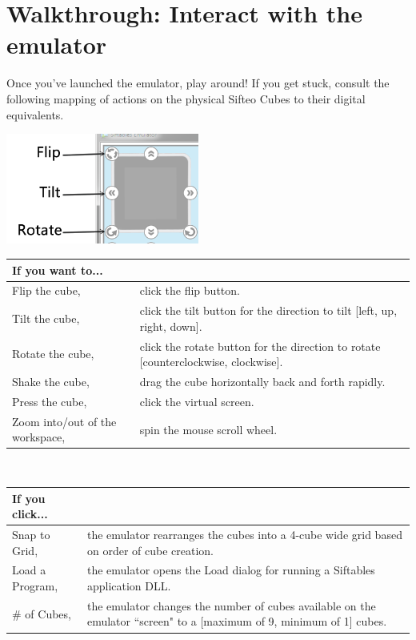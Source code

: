 \documentclass[12pt]{article}
\begin{document}
\section{Walkthrough: Interact with the emulator}
Once you've launched the emulator, play around! If you get stuck, consult the following mapping of actions on the physical Sifteo Cubes to their digital equivalents.

\begin{center}\includegraphics[width=2.5in]{interact}\end{center}
\begin{center}
    \begin{tabular}{ | p{1.5in} | p{4.5in} | }
    \hline
    \textbf{If you want to...}   \\\hline
    Flip the cube,  & click the flip button. \\\hline
    Tilt the cube, & click the tilt button for the direction to tilt [left, up, right, down]. \\\hline
    Rotate the cube, & click the rotate button for the direction to rotate [counterclockwise, clockwise]. \\\hline
    Shake the cube, & drag the cube horizontally back and forth rapidly. \\\hline
    Press the cube, & click the virtual screen. \\\hline
	Zoom into/out of the workspace, & spin the mouse scroll wheel. \\\hline
    \end{tabular}\\

    \begin{tabular}{ | p{1.5in} | p{4.5in} | }
    \hline
    \textbf{If you click...}   \\\hline
    Snap to Grid, & the emulator rearranges the cubes into a 4-cube wide grid based on order of cube creation. \\\hline
    Load a Program, & the emulator opens the Load dialog for running a Siftables application DLL. \\\hline
    \# of Cubes, & the emulator changes the number of cubes available on the emulator ``screen" to a [maximum of 9, minimum of 1] cubes. \\\hline
    \end{tabular}

\end{center}
\end{document}
